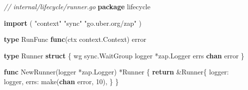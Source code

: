 \documentclass[
]{article}
\newenvironment{Shaded}{}{}
\newcommand{\BuiltInTok}[1]{\textcolor[rgb]{0.00,0.50,0.00}{#1}}
\newcommand{\CommentTok}[1]{\textcolor[rgb]{0.38,0.63,0.69}{\textit{#1}}}
\newcommand{\ControlFlowTok}[1]{\textcolor[rgb]{0.00,0.44,0.13}{\textbf{#1}}}
\newcommand{\DataTypeTok}[1]{\textcolor[rgb]{0.56,0.13,0.00}{#1}}
\newcommand{\DecValTok}[1]{\textcolor[rgb]{0.25,0.63,0.44}{#1}}
\newcommand{\KeywordTok}[1]{\textcolor[rgb]{0.00,0.44,0.13}{\textbf{#1}}}
\newcommand{\NormalTok}[1]{#1}
\newcommand{\OperatorTok}[1]{\textcolor[rgb]{0.40,0.40,0.40}{#1}}
\newcommand{\StringTok}[1]{\textcolor[rgb]{0.25,0.44,0.63}{#1}}
\begin{document}
\begin{Shaded}
\begin{Highlighting}[]
\CommentTok{// internal/lifecycle/runner.go}
\KeywordTok{package}\NormalTok{ lifecycle}

\KeywordTok{import} \OperatorTok{(}
    \StringTok{"context"}
    \StringTok{"sync"}
    \StringTok{"go.uber.org/zap"}
\OperatorTok{)}

\KeywordTok{type}\NormalTok{ RunFunc }\KeywordTok{func}\OperatorTok{(}\NormalTok{ctx context}\OperatorTok{.}\NormalTok{Context}\OperatorTok{)} \DataTypeTok{error}

\KeywordTok{type}\NormalTok{ Runner }\KeywordTok{struct} \OperatorTok{\{}
\NormalTok{    wg     sync}\OperatorTok{.}\NormalTok{WaitGroup}
\NormalTok{    logger }\OperatorTok{*}\NormalTok{zap}\OperatorTok{.}\NormalTok{Logger}
\NormalTok{    errs   }\KeywordTok{chan} \DataTypeTok{error}
\OperatorTok{\}}

\KeywordTok{func}\NormalTok{ NewRunner}\OperatorTok{(}\NormalTok{logger }\OperatorTok{*}\NormalTok{zap}\OperatorTok{.}\NormalTok{Logger}\OperatorTok{)} \OperatorTok{*}\NormalTok{Runner }\OperatorTok{\{}
    \ControlFlowTok{return} \OperatorTok{\&}\NormalTok{Runner}\OperatorTok{\{}
\NormalTok{        logger}\OperatorTok{:}\NormalTok{ logger}\OperatorTok{,}
\NormalTok{        errs}\OperatorTok{:}   \BuiltInTok{make}\OperatorTok{(}\KeywordTok{chan} \DataTypeTok{error}\OperatorTok{,} \DecValTok{10}\OperatorTok{),}
    \OperatorTok{\}}
\OperatorTok{\}}


\end{Highlighting}
\end{Shaded}
\end{document}

